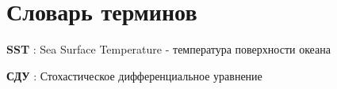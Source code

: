 \chapter*{Словарь терминов}             %

\textbf{SST} : Sea Surface Temperature - температура поверхности океана

\textbf{СДУ} : Стохастическое дифференциальное уравнение